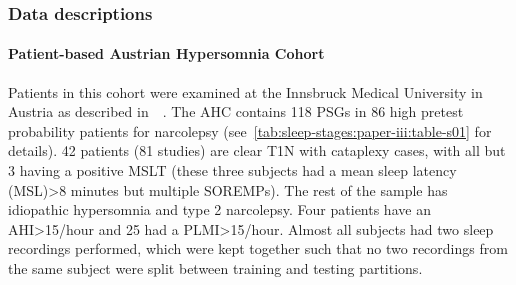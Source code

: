 \subsubsection{Data descriptions}

\paragraph{Patient-based Austrian Hypersomnia Cohort}
Patients in this cohort were examined at the Innsbruck Medical University in Austria as described in~\citeauthor{Frauscher2013}~\cite{Frauscher2013}.
The AHC contains 118 \acp{PSG} in 86 high pretest probability patients for narcolepsy (see~\cref{tab:sleep-stages:paper-iii:table-s01} for details).
42 patients (81 studies) are clear T1N with cataplexy cases, with all but 3 having a positive MSLT (these three subjects had a mean sleep latency (MSL)>8 minutes but multiple SOREMPs).
The rest of the sample has idiopathic hypersomnia and type 2 narcolepsy.
Four patients have an AHI>15/hour and 25 had a PLMI>15/hour.
Almost all subjects had two sleep recordings performed, which were kept together such that no two recordings from the same subject were split between training and testing partitions.

